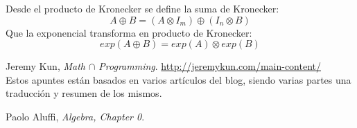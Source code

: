 \documentclass[paper=a4, fontsize=11pt, spanish]{scrartcl}
\numberwithin{equation}{section} %
\numberwithin{figure}{section} %
\numberwithin{table}{section} %
\begin{document}
    Desde el producto de Kronecker se define la suma de Kronecker:
    $$ A \oplus B = (A \otimes I_m) \oplus (I_n \otimes B) $$
    Que la exponencial transforma en producto de Kronecker:
    $$ exp(A \oplus B) = exp(A) \otimes exp(B) $$
    
  \vfill
  \begin{thebibliography}{9}

    Jeremy Kun,
    \emph{Math $\cap$ Programming}. \quad
    \url{http://jeremykun.com/main-content/} \\
    Estos apuntes están basados en varios artículos del blog, siendo 
    varias partes una traducción y resumen de los mismos.
    
    Paolo Aluffi,
    \emph{Algebra, Chapter 0}. \\
    
  \end{thebibliography}
\end{document}
